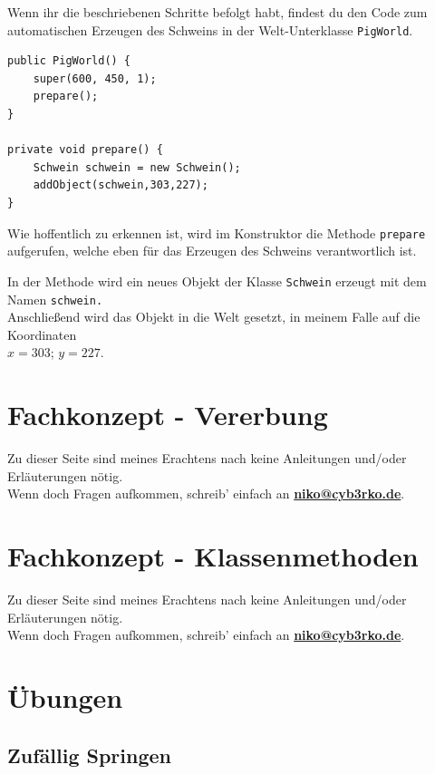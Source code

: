 \documentclass{scrartcl}   %
\begin{document}
Wenn ihr die beschriebenen Schritte befolgt habt, findest du den Code zum automatischen Erzeugen des Schweins in der Welt-Unterklasse \texttt{PigWorld}.\\
\begin{lstlisting}
public PigWorld() {    
    super(600, 450, 1); 
    prepare();
}

private void prepare() {
    Schwein schwein = new Schwein();
    addObject(schwein,303,227);
}
\end{lstlisting}

Wie hoffentlich zu erkennen ist, wird im Konstruktor die Methode \texttt{prepare} aufgerufen, welche eben für das Erzeugen des Schweins verantwortlich ist.

In der Methode wird ein neues Objekt der Klasse \texttt{Schwein} erzeugt mit dem Namen \texttt{schwein.}\\
Anschließend wird das Objekt in die Welt gesetzt, in meinem Falle auf die Koordinaten\\
$x=303$; $y=227$.

\newpage

\section{Fachkonzept - Vererbung}

Zu dieser Seite sind meines Erachtens nach keine Anleitungen und/oder Erläuterungen nötig.\\
Wenn doch Fragen aufkommen, schreib' einfach an \textbf{\href{mailto:niko@cyb3rko.de}{niko@cyb3rko.de}}.

\newpage

\section{Fachkonzept - Klassenmethoden}

Zu dieser Seite sind meines Erachtens nach keine Anleitungen und/oder Erläuterungen nötig.\\
Wenn doch Fragen aufkommen, schreib' einfach an \textbf{\href{mailto:niko@cyb3rko.de}{niko@cyb3rko.de}}.

\newpage

\section{Übungen}

\subsection{Zufällig Springen}
\end{document}
